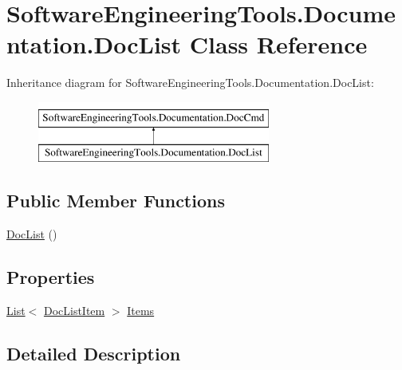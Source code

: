 \hypertarget{class_software_engineering_tools_1_1_documentation_1_1_doc_list}{\section{Software\+Engineering\+Tools.\+Documentation.\+Doc\+List Class Reference}
\label{class_software_engineering_tools_1_1_documentation_1_1_doc_list}
}
Inheritance diagram for Software\+Engineering\+Tools.\+Documentation.\+Doc\+List\+:\begin{figure}[H]
\begin{center}
\leavevmode
\includegraphics[height=2.000000cm]{class_software_engineering_tools_1_1_documentation_1_1_doc_list}
\end{center}
\end{figure}
\subsection*{Public Member Functions}
\begin{DoxyCompactItemize}
\item 
\hyperlink{class_software_engineering_tools_1_1_documentation_1_1_doc_list_ada45bf6b3763efd1412e2a0fe49f4547}{Doc\+List} ()
\end{DoxyCompactItemize}
\subsection*{Properties}
\begin{DoxyCompactItemize}
\item 
\hyperlink{namespace_software_engineering_tools_1_1_documentation_ae0bccf4f49a76db084c1c316e5954ec9a4ee29ca12c7d126654bd0e5275de6135}{List}$<$ \hyperlink{class_software_engineering_tools_1_1_documentation_1_1_doc_list_item}{Doc\+List\+Item} $>$ \hyperlink{class_software_engineering_tools_1_1_documentation_1_1_doc_list_ad3fed80c8386c62e26ce7915ff05340c}{Items}
\end{DoxyCompactItemize}


\subsection{Detailed Description}



